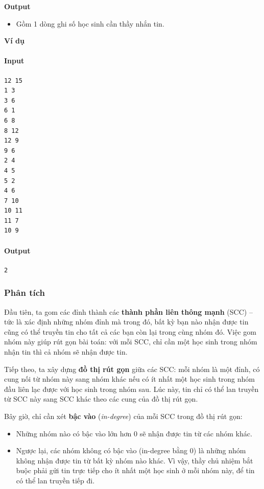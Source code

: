 \documentclass{article}
\begin{document}
\textbf{Output} 
\begin{itemize}
    \item Gồm 1 dòng ghi số học sinh cần thầy nhắn tin.
\end{itemize}


\textbf{Ví dụ}

\paragraph{Input}
\begin{lstlisting}
12 15
1 3
3 6
6 1
6 8
8 12
12 9
9 6
2 4
4 5
5 2
4 6
7 10
10 11
11 7
10 9
\end{lstlisting}

\paragraph{Output}
\begin{lstlisting}
2
\end{lstlisting}

\subsubsection*{Phân tích}

Đầu tiên, ta gom các đỉnh thành các \textbf{thành phần liên thông mạnh} (SCC) -- tức là xác định những nhóm đỉnh mà trong đó, bất kỳ bạn nào nhận được tin cũng có thể truyền tin cho tất cả các bạn còn lại trong cùng nhóm đó. Việc gom nhóm này giúp rút gọn bài toán: với mỗi SCC, chỉ cần một học sinh trong nhóm nhận tin thì cả nhóm sẽ nhận được tin.

Tiếp theo, ta xây dựng \textbf{đồ thị rút gọn} giữa các SCC: mỗi nhóm là một đỉnh, có cung nối từ nhóm này sang nhóm khác nếu có ít nhất một học sinh trong nhóm đầu liên lạc được với học sinh trong nhóm sau. Lúc này, tin chỉ có thể lan truyền từ SCC này sang SCC khác theo các cung của đồ thị rút gọn.

Bây giờ, chỉ cần xét \textbf{bậc vào} (\textit{in-degree}) của mỗi SCC trong đồ thị rút gọn:
\begin{itemize}
    \item Những nhóm nào có bậc vào lớn hơn 0 sẽ nhận được tin từ các nhóm khác.
    \item Ngược lại, các nhóm không có bậc vào (in-degree bằng 0) là những nhóm không nhận được tin từ bất kỳ nhóm nào khác. Vì vậy, thầy chủ nhiệm bắt buộc phải gửi tin trực tiếp cho ít nhất một học sinh ở mỗi nhóm này, để tin có thể lan truyền tiếp đi.
\end{itemize}
\end{document}
